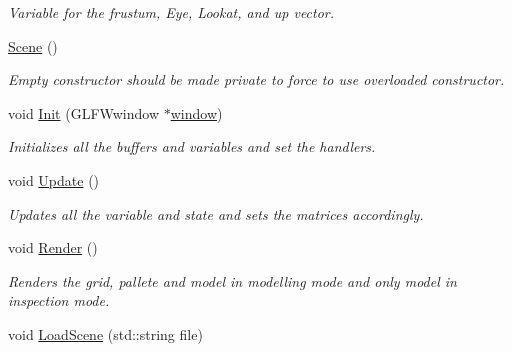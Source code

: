\begin{DoxyCompactItemize}
\begin{DoxyCompactList}\small\item\em Variable for the frustum, Eye, Lookat, and up vector. \end{DoxyCompactList}\item 
\hyperlink{classcft_1_1Scene_a9805c35029c9ce04b4a962f17dfd20d1}{Scene} ()\hypertarget{classcft_1_1Scene_a9805c35029c9ce04b4a962f17dfd20d1}{}\label{classcft_1_1Scene_a9805c35029c9ce04b4a962f17dfd20d1}

\begin{DoxyCompactList}\small\item\em Empty constructor should be made private to force to use overloaded constructor. \end{DoxyCompactList}\item 
void \hyperlink{classcft_1_1Scene_a69cb8696bc40903d5e1216001fd49ae9}{Init} (G\+L\+F\+Wwindow $\ast$\hyperlink{classcft_1_1Scene_a5743ac5a5872b962da380e6b8262a347}{window})\hypertarget{classcft_1_1Scene_a69cb8696bc40903d5e1216001fd49ae9}{}\label{classcft_1_1Scene_a69cb8696bc40903d5e1216001fd49ae9}

\begin{DoxyCompactList}\small\item\em Initializes all the buffers and variables and set the handlers. \end{DoxyCompactList}\item 
void \hyperlink{classcft_1_1Scene_a2a719eb64cfde8c3dba51a9260de3b0a}{Update} ()\hypertarget{classcft_1_1Scene_a2a719eb64cfde8c3dba51a9260de3b0a}{}\label{classcft_1_1Scene_a2a719eb64cfde8c3dba51a9260de3b0a}

\begin{DoxyCompactList}\small\item\em Updates all the variable and state and sets the matrices accordingly. \end{DoxyCompactList}\item 
void \hyperlink{classcft_1_1Scene_a34f80009cb520aaafa9f4cd478538731}{Render} ()\hypertarget{classcft_1_1Scene_a34f80009cb520aaafa9f4cd478538731}{}\label{classcft_1_1Scene_a34f80009cb520aaafa9f4cd478538731}

\begin{DoxyCompactList}\small\item\em Renders the grid, pallete and model in modelling mode and only model in inspection mode. \end{DoxyCompactList}\item 
void \hyperlink{classcft_1_1Scene_ab323e3276fe73f7a771830ae4502ec7e}{Load\+Scene} (std\+::string file)\hypertarget{classcft_1_1Scene_ab323e3276fe73f7a771830ae4502ec7e}{}\label{classcft_1_1Scene_ab323e3276fe73f7a771830ae4502ec7e}


\end{DoxyCompactItemize}
